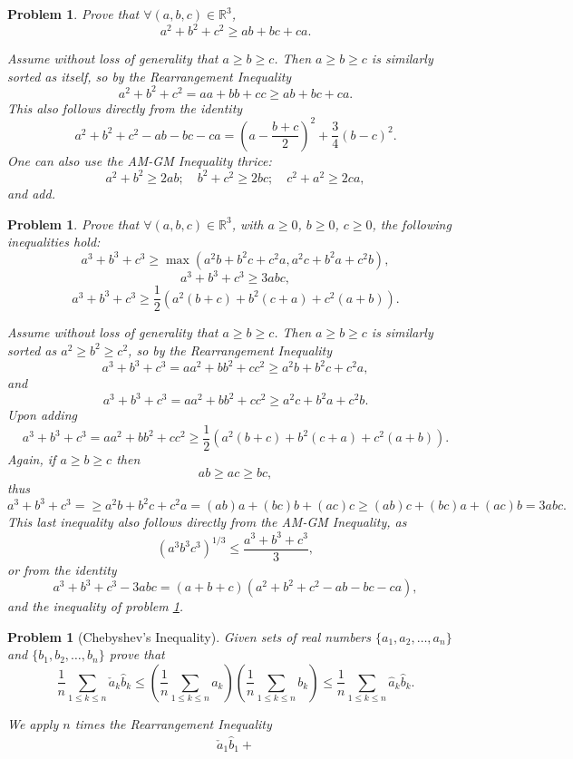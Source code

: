 \documentclass[11pt, openany]{book}
\theoremstyle{change} \theoremheaderfont{\blue\sffamily\bfseries}
\newtheorem{pro}[thm]{Problem}
\theoremstyle{nonumberplain} \theoremheaderfont{\sffamily\bfseries}
\newcommand{\BBR}{\mathbb{R}}
\newcommand{\í}{\'{\i}}
\begin{document}
\begin{multicols}{2}
\begin{pro}\label{pro:sum-squares-ineq}
Prove that $\forall (a, b, c)\in\BBR^3$,
$$ a^2+b^2+c^2\geq ab + bc +ca. $$
\begin{answer}
Assume without loss of generality that  $a\geq b \geq c$. Then
$a\geq b \geq c$ is similarly sorted as itself, so by the
Rearrangement Inequality
$$ a^2 + b^2 + c^2=aa+bb+cc \geq ab + bc + ca. $$
This also follows directly from the identity
$$ a^2+b^2+c^2-ab-bc-ca = \left(a-\dfrac{b+c}{2}\right)^2+\dfrac{3}{4}\left(b-c\right)^2. $$
One can also use the AM-GM Inequality thrice:
$$a^2+b^2\geq 2ab; \quad  b^2+c^2\geq 2bc;\quad c^2+a^2\geq 2ca,
$$and add.
\end{answer}
\end{pro}
\begin{pro}
Prove that $\forall (a, b, c)\in\BBR^3$, with $a\geq 0$, $b \geq 0$,
$c\geq 0$, the following inequalities hold:
$$ a^3+b^3+c^3\geq \max(a^2b + b^2c +c^2a, a^2c+b^2a+c^2b), $$
$$ a^3+b^3+c^3\geq 3abc,  $$ $$ a^3+b^3+c^3\geq \dfrac{1}{2}\left(a^2(b+c) + b^2(c+a) +
c^2(a+b)\right).  $$
\begin{answer}
Assume without loss of generality that  $a\geq b \geq c$. Then
$a\geq b \geq c$ is similarly sorted as $a^2\geq b^2 \geq c^2$, so
by the Rearrangement Inequality
$$  a^3+b^3+c^3= aa^2 + bb^2 + cc^2 \geq a^2b + b^2c + c^2a,$$
and
$$  a^3+b^3+c^3= aa^2 + bb^2 + cc^2 \geq a^2c + b^2a + c^2b.$$
Upon adding $$  a^3+b^3+c^3= aa^2 + bb^2 + cc^2 \geq
\dfrac{1}{2}\left(a^2(b+c) + b^2(c+a) + c^2(a+b)\right).$$Again, if
$a\geq b \geq c$ then $$ab\geq ac \geq bc, $$ thus
$$ a^3+b^3+c^3=  \geq a^2b + b^2c + c^2a = (ab)a+(bc)b+(ac)c\geq (ab)c+(bc)a+(ac)b=3abc.   $$
This last inequality also follows directly from the AM-GM
Inequality, as
$$ (a^3b^3c^3)^{1/3}\leq \dfrac{a^3+b^3+c^3}{3}, $$or from the
identity
$$ a^3+b^3+c^3-3abc= (a+b+c)(a^2+b^2+c^2-ab-bc-ca), $$and the
inequality of problem \ref{pro:sum-squares-ineq}.
\end{answer}
\end{pro}
\begin{pro}[Chebyshev's Inequality] Given sets of real numbers $\{a_1, a_2, \ldots , a_n\}$ and $\{b_1,
b_2, \ldots , b_n\}$ prove that $$\dfrac{1}{n} \sum _{1\leq k\leq
n}\check{a}_k\hat{b}_k \leq \left(\dfrac{1}{n}\sum _{1\leq k \leq n}
a_k\right)\left(\dfrac{1}{n}\sum _{1\leq k \leq n}b_k \right)\leq
\dfrac{1}{n}\sum _{1\leq k \leq n}\hat{a}_k\hat{b}_k.
$$
\begin{answer}
We apply $n$ times the Rearrangement Inequality
$$\begin{array}{lllll}\check{a}_1\hat{b}_1+

\end{array}$$
\end{answer}
\end{pro}
\end{multicols}
\end{document}

